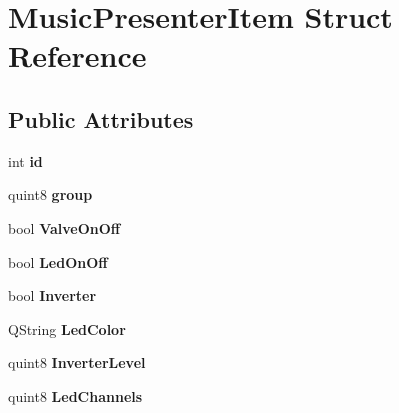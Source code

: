 \hypertarget{struct_music_presenter_item}{}\section{Music\+Presenter\+Item Struct Reference}
\label{struct_music_presenter_item}
\subsection*{Public Attributes}
\begin{DoxyCompactItemize}
\item 
\mbox{\label{struct_music_presenter_item_aedd277faf798664e15e7ed25d31f8c28}} 
int {\bfseries id}
\item 
\mbox{\label{struct_music_presenter_item_a731da3c2eb3657a7c32ab332928392c8}} 
quint8 {\bfseries group}
\item 
\mbox{\label{struct_music_presenter_item_ae777fd26d47640ca3625da3c43c3646b}} 
bool {\bfseries Valve\+On\+Off}
\item 
\mbox{\label{struct_music_presenter_item_a612270b7dfd0a735f2c82806ab988966}} 
bool {\bfseries Led\+On\+Off}
\item 
\mbox{\label{struct_music_presenter_item_a44ae461c82d448f1de13f10ba97807c3}} 
bool {\bfseries Inverter}
\item 
\mbox{\label{struct_music_presenter_item_addc6a7753cd0992ecdd1f625d7f9900e}} 
Q\+String {\bfseries Led\+Color}
\item 
\mbox{\label{struct_music_presenter_item_a8575d087ae129f8f76528e4a3c8482a9}} 
quint8 {\bfseries Inverter\+Level}
\item 
\mbox{\label{struct_music_presenter_item_a154782edf773c9cad6ed6eea71433ab6}} 
quint8 {\bfseries Led\+Channels}
\item 
\mbox{\label{struct_music_presenter_item_a1862de2508b9bf3462199f40d856d4d3}} 

\end{DoxyCompactItemize}

